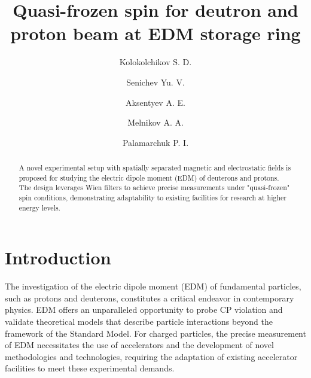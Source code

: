 \documentclass[submitting]{nst}
\begin{document}
\title{Quasi-frozen spin for deutron and proton beam at EDM storage ring}

\author{Kolokolchikov S. D.}

\author{Senichev Yu. V.}

\author{Aksentyev A. E.}

\author{Melnikov A. A.}

\author{Palamarchuk P. I.}

\begin{abstract}
A novel experimental setup with spatially separated magnetic and electrostatic fields is proposed for studying the electric dipole moment (EDM) of deuterons and protons. The design leverages Wien filters to achieve precise measurements under "quasi-frozen" spin conditions, demonstrating adaptability to existing facilities for research at higher energy levels.
\end{abstract}


\maketitle

\section{Introduction}\label{sec.I}
\par The investigation of the electric dipole moment (EDM) of fundamental particles, such as protons and deuterons, constitutes a critical endeavor in contemporary physics. EDM offers an unparalleled opportunity to probe CP violation and validate theoretical models that describe particle interactions beyond the framework of  the Standard Model. For charged particles, the precise measurement of EDM necessitates the use of accelerators and the development of novel methodologies and technologies, requiring the adaptation of existing accelerator facilities to meet these experimental demands.
\end{document}
